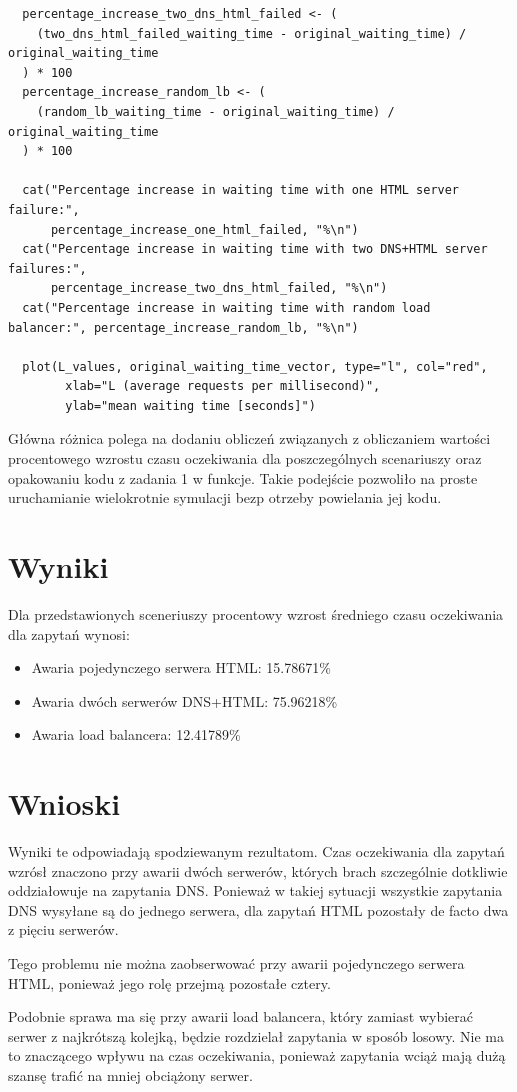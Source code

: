 \documentclass[12pt,oneside,a4paper]{book} %
\theoremstyle{break}
\begin{document}
\begin{small}
\begin{verbatim}
  percentage_increase_two_dns_html_failed <- (
    (two_dns_html_failed_waiting_time - original_waiting_time) / original_waiting_time
  ) * 100
  percentage_increase_random_lb <- (
    (random_lb_waiting_time - original_waiting_time) / original_waiting_time
  ) * 100
  
  cat("Percentage increase in waiting time with one HTML server failure:", 
      percentage_increase_one_html_failed, "%\n")
  cat("Percentage increase in waiting time with two DNS+HTML server failures:", 
      percentage_increase_two_dns_html_failed, "%\n")
  cat("Percentage increase in waiting time with random load balancer:", percentage_increase_random_lb, "%\n")
  
  plot(L_values, original_waiting_time_vector, type="l", col="red",
        xlab="L (average requests per millisecond)", 
        ylab="mean waiting time [seconds]")
\end{verbatim}
\end{small}

Główna różnica polega na dodaniu obliczeń związanych z obliczaniem wartości procentowego wzrostu czasu oczekiwania dla poszczególnych scenariuszy oraz opakowaniu kodu z zadania 1 w funkcje. Takie podejście pozwoliło na proste uruchamianie wielokrotnie symulacji bezp otrzeby powielania jej kodu.

\section*{Wyniki}

Dla przedstawionych sceneriuszy procentowy wzrost średniego czasu oczekiwania dla zapytań wynosi:
\begin{itemize}
  \item Awaria pojedynczego serwera HTML: 15.78671\%
  \item Awaria dwóch serwerów DNS+HTML: 75.96218\%
  \item Awaria load balancera: 12.41789\%
\end{itemize}

\section*{Wnioski}

Wyniki te odpowiadają spodziewanym rezultatom. Czas oczekiwania dla zapytań wzrósł znaczono przy awarii dwóch serwerów, których brach szczególnie dotkliwie oddziałowuje na zapytania DNS. Ponieważ w takiej sytuacji wszystkie zapytania DNS wysyłane są do jednego serwera, dla zapytań HTML pozostały de facto dwa z pięciu serwerów.

Tego problemu nie można zaobserwować przy awarii pojedynczego serwera HTML, ponieważ jego rolę przejmą pozostałe cztery.

Podobnie sprawa ma się przy awarii load balancera, który zamiast wybierać serwer z najkrótszą kolejką, będzie rozdzielał zapytania w sposób losowy. Nie ma to znaczącego wpływu na czas oczekiwania, ponieważ zapytania wciąż mają dużą szansę trafić na mniej obciążony serwer.
\end{document}
